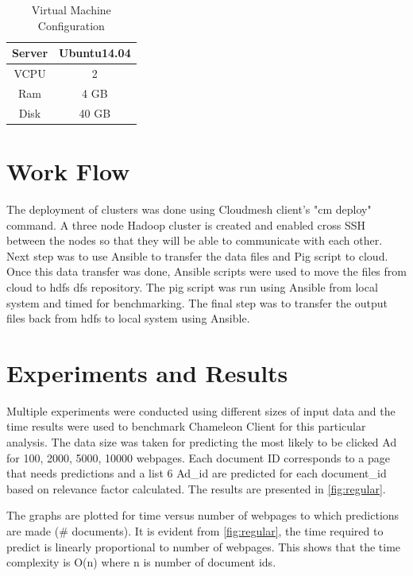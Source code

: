 \documentclass[9pt,twocolumn,twoside]{../../styles/osajnl}
\begin{document}
\begin{table}
\begin{tabular}{|c|c|}
\hline
    Server & Ubuntu14.04 \\ \hline
    VCPU & 2 \\\hline
    Ram & 4 GB \\\hline
    Disk & 40 GB\\\hline
\end{tabular}
\caption{Virtual Machine Configuration}
\end{table}

\section{Work Flow}
The deployment of clusters was done using Cloudmesh client's "cm deploy" command. A three node Hadoop cluster is created and enabled cross SSH between the nodes so that they will be able to communicate with each other. Next step was to use Ansible to transfer the data files and Pig script to cloud. Once this data transfer was done, Ansible scripts were used to move the files from cloud to hdfs dfs repository. The pig script was run using Ansible from local system and timed for benchmarking. The final step was to transfer the output files back from hdfs to local system using Ansible.

\section{Experiments and Results}
Multiple experiments were conducted using different sizes of input data and the time results were used to benchmark Chameleon Client for this particular analysis. The data size was taken for predicting the most likely to be clicked Ad for 100, 2000, 5000, 10000 webpages. Each document ID corresponds to a page that needs predictions and a list 6 Ad\_id are predicted for each document\_id based on relevance factor calculated.
The results are presented in  \ref{fig:regular}.  

The graphs are plotted for time versus number of webpages to which predictions are made (\# documents). It is evident from \ref{fig:regular}, the time required to predict is linearly proportional to number of webpages. This shows that the time complexity is O(n) where n is number of document ids.
\end{document}
